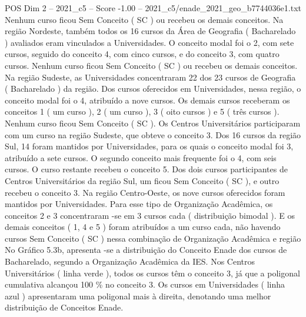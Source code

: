 \begin{textsample}{POS Dim 2 – 2021\_c5 – Score -1.00 – 2021\_c5/enade\_2021\_geo\_b7744036e1.txt}
Nenhum curso ficou Sem Conceito ( SC ) ou recebeu os demais conceitos.
Na região Nordeste, também todos os 16 cursos da Área de Geografia ( Bacharelado ) avaliados eram vinculados a Universidades.
O conceito modal foi o 2, com sete cursos, seguido do conceito 4, com cinco cursos, e do conceito 3, com quatro cursos.
Nenhum curso ficou Sem Conceito ( SC ) ou recebeu os demais conceitos.
Na região Sudeste, as Universidades concentraram 22 dos 23 cursos de Geografia ( Bacharelado ) da região.
Dos cursos oferecidos em Universidades, nessa região, o conceito modal foi o 4, atribuído a nove cursos.
Os demais cursos receberam os conceitos 1 ( um curso ), 2 ( um curso ), 3 ( oito cursos ) e 5 ( três cursos ).
Nenhum curso ficou Sem Conceito ( SC ).
Os Centros Universitários participaram com um curso na região Sudeste, que obteve o conceito 3.
Dos 16 cursos da região Sul, 14 foram mantidos por Universidades, para os quais o conceito modal foi 3, atribuído a sete cursos.
O segundo conceito mais frequente foi o 4, com seis cursos.
O curso restante recebeu o conceito 5.
Dos dois cursos participantes de Centros Universitários da região Sul, um ficou Sem Conceito ( SC ), e outro recebeu o conceito 3.
Na região Centro-Oeste, os nove cursos oferecidos foram mantidos por Universidades.
Para esse tipo de Organização Acadêmica, os conceitos 2 e 3 concentraram -se em 3 cursos cada ( distribuição bimodal ).
E os demais conceitos ( 1, 4 e 5 ) foram atribuídos a um curso cada, não havendo cursos Sem Conceito ( SC ) nessa combinação de Organização Acadêmica e região No Gráfico 5.3b, apresenta -se a distribuição do Conceito Enade dos cursos de Bacharelado, segundo a Organização Acadêmica da IES.
Nos Centros Universitários ( linha verde ), todos os cursos têm o conceito 3, já que a poligonal cumulativa alcançou 100 \% no conceito 3.
Os cursos em Universidades ( linha azul ) apresentaram uma poligonal mais à direita, denotando uma melhor distribuição de Conceitos Enade.

\end{textsample}

